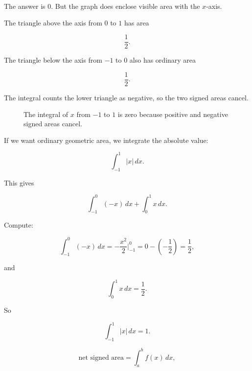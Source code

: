 The answer is \(0\).  But the graph does enclose visible area with the \(x\)-axis.

The triangle above the axis from \(0\) to \(1\) has area

\[
\frac12.
\]

The triangle below the axis from \(-1\) to \(0\) also has ordinary area

\[
\frac12.
\]

The integral counts the lower triangle as negative, so the two signed areas cancel.

\begin{figure}[h]
\centering
{}
\caption{The integral of \(x\) from \(-1\) to \(1\) is zero because positive and negative signed areas cancel.}
\label{fig:signed-area-cancellation-line}
\end{figure}

If we want ordinary geometric area, we integrate the absolute value:

\[
\int_{-1}^{1} |x|\,dx.
\]

This gives

\[
\int_{-1}^{0} (-x)\,dx+\int_0^1 x\,dx.
\]

Compute:

\[
\int_{-1}^{0} (-x)\,dx
=
-\frac{x^2}{2}\Big|_{-1}^{0}
=
0-\left(-\frac12\right)
=
\frac12,
\]

and

\[
\int_0^1 x\,dx
=
\frac12.
\]

So

\[
\int_{-1}^{1}|x|\,dx=1.
\]

\[
\boxed{
\text{net signed area}=\int_a^b f(x)\,dx,
}
\]

